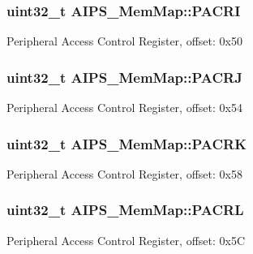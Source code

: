 \subsubsection[{P\+A\+C\+R\+I}]{\setlength{\rightskip}{0pt plus 5cm}uint32\+\_\+t A\+I\+P\+S\+\_\+\+Mem\+Map\+::\+P\+A\+C\+R\+I}\label{struct_a_i_p_s___mem_map_a75787ffd284dd47814093fbe8d28232d}
Peripheral Access Control Register, offset\+: 0x50 \hypertarget{struct_a_i_p_s___mem_map_aa8170562fdbb48e8ade84f0992479a98}{}
\subsubsection[{P\+A\+C\+R\+J}]{\setlength{\rightskip}{0pt plus 5cm}uint32\+\_\+t A\+I\+P\+S\+\_\+\+Mem\+Map\+::\+P\+A\+C\+R\+J}\label{struct_a_i_p_s___mem_map_aa8170562fdbb48e8ade84f0992479a98}
Peripheral Access Control Register, offset\+: 0x54 \hypertarget{struct_a_i_p_s___mem_map_a62015f5d8f85dd001390b0168aa7389f}{}
\subsubsection[{P\+A\+C\+R\+K}]{\setlength{\rightskip}{0pt plus 5cm}uint32\+\_\+t A\+I\+P\+S\+\_\+\+Mem\+Map\+::\+P\+A\+C\+R\+K}\label{struct_a_i_p_s___mem_map_a62015f5d8f85dd001390b0168aa7389f}
Peripheral Access Control Register, offset\+: 0x58 \hypertarget{struct_a_i_p_s___mem_map_a564d95efed1747932b25675342cac085}{}
\subsubsection[{P\+A\+C\+R\+L}]{\setlength{\rightskip}{0pt plus 5cm}uint32\+\_\+t A\+I\+P\+S\+\_\+\+Mem\+Map\+::\+P\+A\+C\+R\+L}\label{struct_a_i_p_s___mem_map_a564d95efed1747932b25675342cac085}
Peripheral Access Control Register, offset\+: 0x5\+C \hypertarget{struct_a_i_p_s___mem_map_a30e7ebe0ffb0e9d97cbfa85d65e17cbb}{}
